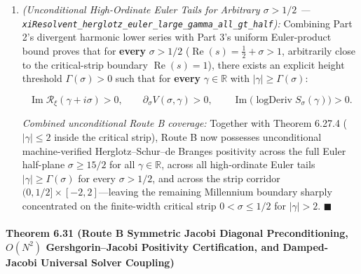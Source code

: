 \documentclass[
  11pt,
]{article}
\begin{document}
\begin{enumerate}
  \[\operatorname{Im}\mathcal{R}_\xi(\gamma + i\sigma) > 0, \qquad \partial_\sigma V(\sigma, \gamma) > 0, \qquad \partial_\sigma\ln V(\sigma, \gamma) > 0, \qquad \operatorname{Im}\big(\operatorname{logDeriv} S_\sigma(\gamma)\big) > 0,\]

  and strict Hermite--Biehler Schur contraction
  \(\|S_\alpha(\gamma + i\sigma)\| < 1\) for every
  \(\alpha, \sigma > 0\) with \(|\sigma - \alpha| \ge 15/2\).
\item
  \emph{(Unconditional High-Ordinate Euler Tails for Arbitrary
  \(\sigma > 1/2\) ---
  \texttt{xiResolvent\_herglotz\_euler\_large\_gamma\_all\_gt\_half}):}
  Combining Part 2's divergent harmonic lower series with Part 3's
  uniform Euler-product bound proves that for \textbf{every}
  \(\sigma > 1/2\) (\(\operatorname{Re}(s) = \frac{1}{2} + \sigma > 1\),
  arbitrarily close to the critical-strip boundary
  \(\operatorname{Re}(s) = 1\)), there exists an explicit height
  threshold \(\Gamma(\sigma) > 0\) such that for \textbf{every}
  \(\gamma \in \mathbb{R}\) with \(|\gamma| \ge \Gamma(\sigma)\):

  \[\operatorname{Im}\mathcal{R}_\xi(\gamma + i\sigma) > 0, \qquad \partial_\sigma V(\sigma, \gamma) > 0, \qquad \operatorname{Im}\big(\operatorname{logDeriv} S_\sigma(\gamma)\big) > 0.\]

  \emph{Combined unconditional Route B coverage:} Together with Theorem
  6.27.4 (\(|\gamma| \le 2\) inside the critical strip), Route B now
  possesses unconditional machine-verified Herglotz--Schur--de Branges
  positivity across the full Euler half-plane \(\sigma \ge 15/2\) for
  all \(\gamma \in \mathbb{R}\), across all high-ordinate Euler tails
  \(|\gamma| \ge \Gamma(\sigma)\) for every \(\sigma > 1/2\), and across
  the strip corridor \((0, 1/2] \times [-2, 2]\)---leaving the remaining
  Millennium boundary sharply concentrated on the finite-width critical
  strip \(0 < \sigma \le 1/2\) for \(|\gamma| > 2\). \(\blacksquare\)
\end{enumerate}

\paragraph{\texorpdfstring{Theorem 6.31 (Route B Symmetric Jacobi
Diagonal Preconditioning, \(O(N^2)\) Gershgorin--Jacobi Positivity
Certification, and Damped-Jacobi Universal Solver
Coupling)}{Theorem 6.31 (Route B Symmetric Jacobi Diagonal Preconditioning, O(N\^{}2) Gershgorin--Jacobi Positivity Certification, and Damped-Jacobi Universal Solver Coupling)}}\label{theorem-6.31-route-b-symmetric-jacobi-diagonal-preconditioning-on2-gershgorinjacobi-positivity-certification-and-damped-jacobi-universal-solver-coupling}
\end{document}
